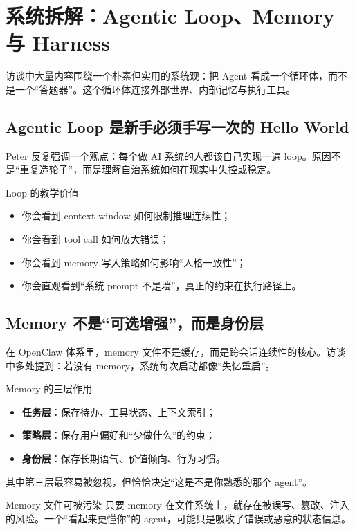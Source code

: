 \section{系统拆解：Agentic Loop、Memory 与 Harness}

访谈中大量内容围绕一个朴素但实用的系统观：把 Agent 看成一个循环体，而不是一个“答题器”。这个循环体连接外部世界、内部记忆与执行工具。

\subsection{Agentic Loop 是新手必须手写一次的 Hello World}

Peter 反复强调一个观点：每个做 AI 系统的人都该自己实现一遍 loop。原因不是“重复造轮子”，而是理解自治系统如何在现实中失控或稳定。

\begin{importantbox}{Loop 的教学价值}
\begin{itemize}
    \item 你会看到 context window 如何限制推理连续性；
    \item 你会看到 tool call 如何放大错误；
    \item 你会看到 memory 写入策略如何影响“人格一致性”；
    \item 你会直观看到“系统 prompt 不是墙”，真正的约束在执行路径上。
\end{itemize}
\end{importantbox}

\subsection{Memory 不是“可选增强”，而是身份层}

在 OpenClaw 体系里，memory 文件不是缓存，而是跨会话连续性的核心。访谈中多处提到：若没有 memory，系统每次启动都像“失忆重启”。

\begin{knowledgebox}{Memory 的三层作用}
\begin{itemize}
    \item \textbf{任务层}：保存待办、工具状态、上下文索引；
    \item \textbf{策略层}：保存用户偏好和“少做什么”的约束；
    \item \textbf{身份层}：保存长期语气、价值倾向、行为习惯。
\end{itemize}
其中第三层最容易被忽视，但恰恰决定“这是不是你熟悉的那个 agent”。
\end{knowledgebox}

\begin{warningbox}{Memory 文件可被污染}
只要 memory 在文件系统上，就存在被误写、篡改、注入的风险。一个“看起来更懂你”的 agent，可能只是吸收了错误或恶意的状态信息。
\end{warningbox}

